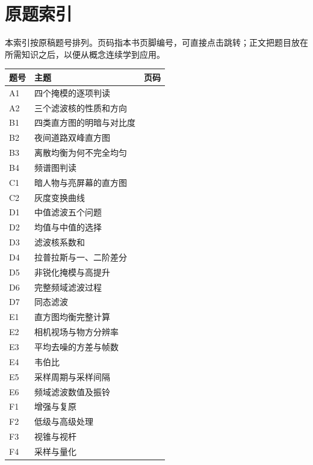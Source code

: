 \clearpage
\section{原题索引}
本索引按原稿题号排列。页码指本书页脚编号，可直接点击跳转；正文把题目放在所需知识之后，以便从概念连续学到应用。
\begin{longtable}{p{13mm}p{119mm}p{17mm}}
\toprule 题号 & 主题 & 页码\\\midrule
\endhead
A1 & 四个掩模的逐项判读 & \pageref{original:A1}\\
A2 & 三个滤波核的性质和方向 & \pageref{original:A2}\\
B1 & 四类直方图的明暗与对比度 & \pageref{original:B1}\\
B2 & 夜间道路双峰直方图 & \pageref{original:B2}\\
B3 & 离散均衡为何不完全均匀 & \pageref{original:B3}\\
B4 & 频谱图判读 & \pageref{original:B4}\\
C1 & 暗人物与亮屏幕的直方图 & \pageref{original:C1}\\
C2 & 灰度变换曲线 & \pageref{original:C2}\\
D1 & 中值滤波五个问题 & \pageref{original:D1}\\
D2 & 均值与中值的选择 & \pageref{original:D2}\\
D3 & 滤波核系数和 & \pageref{original:D3}\\
D4 & 拉普拉斯与一、二阶差分 & \pageref{original:D4}\\
D5 & 非锐化掩模与高提升 & \pageref{original:D5}\\
D6 & 完整频域滤波过程 & \pageref{original:D6}\\
D7 & 同态滤波 & \pageref{original:D7}\\
E1 & 直方图均衡完整计算 & \pageref{original:E1}\\
E2 & 相机视场与物方分辨率 & \pageref{original:E2}\\
E3 & 平均去噪的方差与帧数 & \pageref{original:E3}\\
E4 & 韦伯比 & \pageref{original:E4}\\
E5 & 采样周期与采样间隔 & \pageref{original:E5}\\
E6 & 频域滤波数值及振铃 & \pageref{original:E6}\\
F1 & 增强与复原 & \pageref{original:F1}\\
F2 & 低级与高级处理 & \pageref{original:F2}\\
F3 & 视锥与视杆 & \pageref{original:F3}\\
F4 & 采样与量化 & \pageref{original:F4}\\

\end{longtable}

